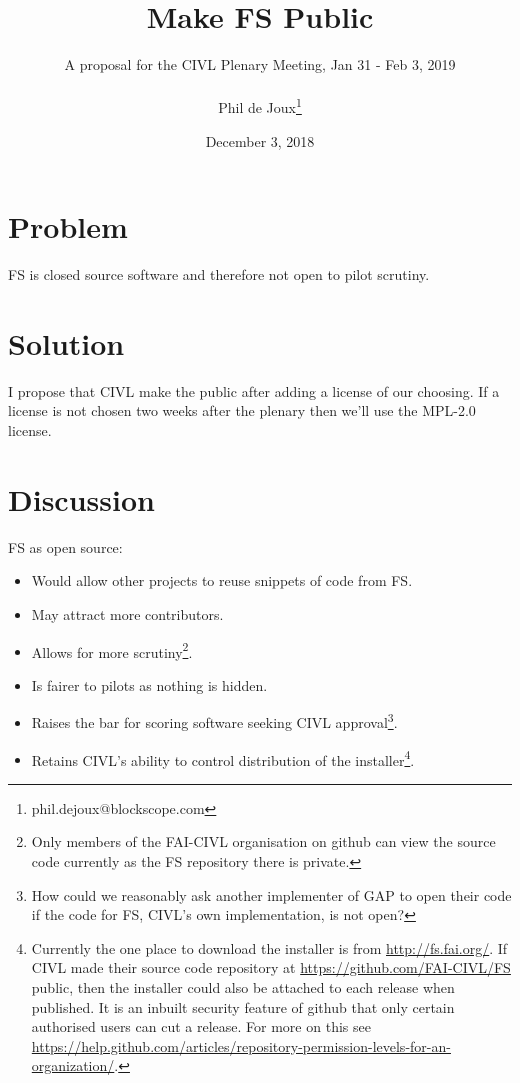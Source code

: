 \documentclass{article}
\title{Make FS Public}
\date{December 3, 2018}
\author{A proposal for the CIVL Plenary Meeting, Jan 31 - Feb 3, 2019\\\\
Phil de Joux\thanks{phil.dejoux@blockscope.com}}
\begin{document}
\maketitle
\section*{Problem}
FS is closed source software and therefore not open to pilot scrutiny.

\section*{Solution}
I propose that CIVL make the  public after adding a license of our choosing. If a license is not
chosen two weeks after the plenary then we'll use the MPL-2.0 license.

\section*{Discussion}
FS as open source:\\
\begin{itemize}
    \item Would allow other projects to reuse snippets of code from FS.
    \item May attract more contributors.
    \item Allows for more scrutiny\footnote{Only members of the FAI-CIVL
    organisation on github can view the source code currently as the FS
    repository there is private.}.
    \item Is fairer to pilots as nothing is hidden.
    \item Raises the bar for scoring software seeking CIVL
    approval\footnote{How could we reasonably ask another implementer of GAP to
    open their code if the code for FS, CIVL's own implementation, is not
    open?}.
    \item Retains CIVL's ability to control distribution of the
    installer\footnote{Currently the one place to download the installer is
    from \url{http://fs.fai.org/}. If CIVL made their source code repository at
    \url{https://github.com/FAI-CIVL/FS} public, then the installer could also
    be attached to each release when published. It is an inbuilt security
    feature of github that only certain authorised users can cut a release. For
    more on this see
    \url{https://help.github.com/articles/repository-permission-levels-for-an-organization/}.}.
\end{itemize}
\end{document}

